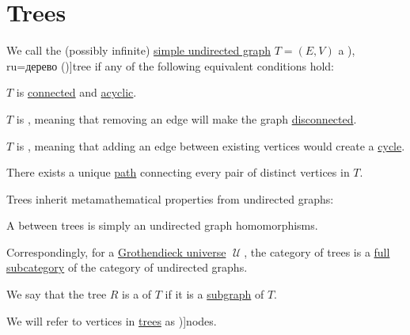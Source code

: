 \section{Trees}\label{sec:trees}

\begin{definition}\label{def:tree}
  We call the (possibly infinite) \hyperref[def:undirected_graph]{simple undirected graph} \( T = (E, V) \) a \term[bg=дърво (\cite[21]{Мирчев2001Графи}), ru=дерево (\cite[53]{ЕмеличевИПр1990Графы})]{tree} if any of the following equivalent conditions hold:
  \begin{thmenum}[series=def:tree]
     \( T \) is \hyperref[def:graph_connectedness/undirected]{connected} and \hyperref[def:acyclic_graph]{acyclic}.

     \( T \) is , meaning that removing an edge will make the graph \hyperref[def:graph_connectedness/undirected]{disconnected}.

     \( T \) is , meaning that adding an edge between existing vertices would create a \hyperref[def:graph_cycle]{cycle}.

     There exists a unique \hyperref[def:graph_walk/path]{path} connecting every pair of distinct vertices in \( T \).
  \end{thmenum}

  Trees inherit metamathematical properties from undirected graphs:
  \begin{thmenum}[resume=def:tree]
    \mimprovised A  between trees is simply an undirected graph homomorphisms.

    \mimprovised Correspondingly, for a \hyperref[def:grothendieck_universe]{Grothendieck universe} \( \mscrU \), the category of trees is a \hyperref[def:subcategory/full]{full subcategory} of the category of undirected graphs.

     We say that the tree \( R \) is a  of \( T \) if it is a \hyperref[def:undirected_graph/subgraph]{subgraph} of \( T \).
  \end{thmenum}
\end{definition}
\begin{comments}
  \item We will refer to vertices in \hyperref[def:tree]{trees} as \term[en=node (\cite[190]{Erickson2019Algorithms})]{nodes}.
\end{comments}
